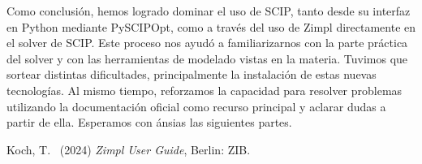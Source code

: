 \documentclass[11pt, a4paper, pdftex]{article}
\begin{document}
Como conclusión, hemos logrado dominar el uso de SCIP, tanto desde su interfaz en Python mediante PySCIPOpt, como a través del uso de Zimpl directamente en el solver de SCIP. Este proceso nos ayudó a familiarizarnos con la parte práctica del solver y con las herramientas de modelado vistas en la materia. Tuvimos que sortear distintas dificultades, principalmente la instalación de estas nuevas tecnologías. Al mismo tiempo, reforzamos la capacidad para resolver problemas utilizando la documentación oficial como recurso principal y aclarar dudas a partir de ella. Esperamos con ánsias las siguientes partes.
\begin{thebibliography}{99}
	Koch, T.\
	(2024)
	\emph{Zimpl User Guide},
	Berlin: ZIB.
\end{thebibliography}
\end{document}
